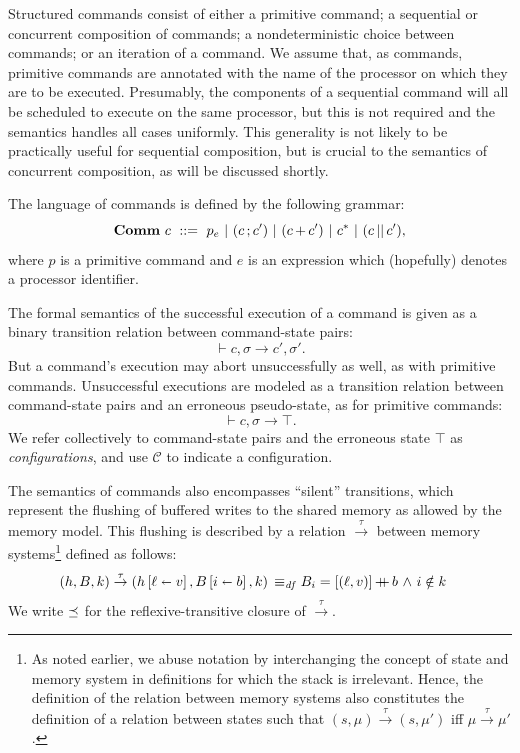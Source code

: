 \documentclass[11pt]{article}
\begin{document}
Structured commands consist of either a primitive command; a sequential or concurrent composition of commands; a nondeterministic choice between commands; or an iteration of a command. We assume that, as commands, primitive commands are annotated with the name of the processor on which they are to be executed. Presumably, the components of a sequential command will all be scheduled to execute on the same processor, but this is not required and the semantics handles all cases uniformly. This generality is not likely to be practically useful for sequential composition, but is crucial to the semantics of concurrent composition, as will be discussed shortly. 

The language of commands is defined by the following grammar: \[ \mathbf{Comm}~c ~::=~ p_e ~|~ (c \operatorname{;} c') ~|~ (c \operatorname{+} c') ~|~ c^{\operatorname{\ast}} ~|~ (c \operatorname{||} c'),\] where $p$ is a primitive command and $e$ is an expression which (hopefully) denotes a processor identifier.  

The formal semantics of the successful execution of a command is given as a binary transition relation between command-state pairs: \[ \vdash c,\sigma \rightarrow c',\sigma'.\] But a command's execution may abort unsuccessfully as well, as with primitive commands. Unsuccessful executions are modeled as a transition relation between command-state pairs and an erroneous pseudo-state, as for primitive commands: \[ \vdash c,\sigma \rightarrow \top. \] We refer collectively to command-state pairs and the erroneous state $\top$ as \emph{configurations}, and use $\mathcal{C}$ to indicate a configuration. 

The semantics of commands also encompasses ``silent'' transitions, which represent the flushing of buffered writes to the shared memory as allowed by the memory model. This flushing is described by a relation $\stackrel{\tau}{\rightarrow}$ between memory systems\footnote{As noted earlier, we abuse notation by interchanging the concept of state and memory system in definitions for which the stack is irrelevant. Hence, the definition of the relation between memory systems  also constitutes the definition of a relation between states such that $(s,\mu) \stackrel{\tau}{\rightarrow} (s,\mu')$ iff $\mu \stackrel{\tau}{\rightarrow} \mu'$.} defined as follows: \begin{align*} (h,B,k) \stackrel{\tau}{\rightarrow} (h \left[ \ell \shortleftarrow v \right],B \left[ i \shortleftarrow b \right],k) \operatorname{\;\equiv_{\mathit{df}}\;} & B_i = \left[(\ell,v)\right] \operatorname{+\!\!\!+} b \operatorname{\,\wedge\,} i \notin k 
\end{align*} We write $\preceq$ for the reflexive-transitive closure of $\stackrel{\tau}{\rightarrow}$. 
\end{document}
